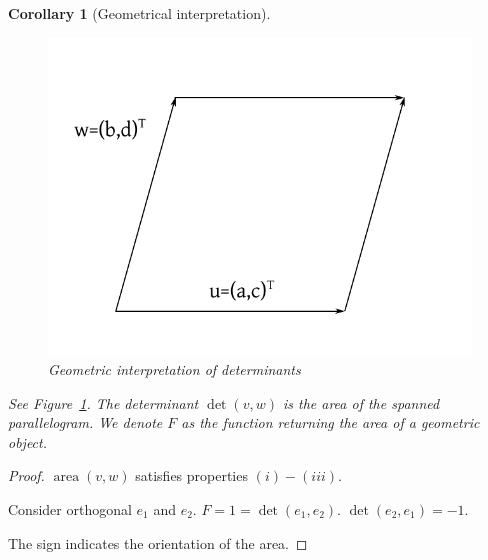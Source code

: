 \documentclass{article}
\newtheorem*{corollary}{Corollary}%
\begin{document}
\begin{corollary}[Geometrical interpretation]
  \begin{figure}[!h]
    \begin{center}
      \includegraphics{img/01_geometric_interpretation_determinant.pdf}
      \caption{Geometric interpretation of determinants}
      \label{img:geo_det}
    \end{center}
  \end{figure}
  See Figure~\ref{img:geo_det}.
  The determinant $\det(v,w)$ is the area of the spanned parallelogram.
  We denote $F$ as the function returning the area of a geometric object.
\end{corollary}

\begin{proof}
  $\operatorname{area}(v,w)$ satisfies properties $(i)-(iii)$.

  Consider orthogonal $e_1$ and $e_2$.
  $F = 1 = \det(e_1, e_2)$. $\det(e_2, e_1) = -1$.

  The sign indicates the orientation of the area.
\end{proof}
\end{document}
